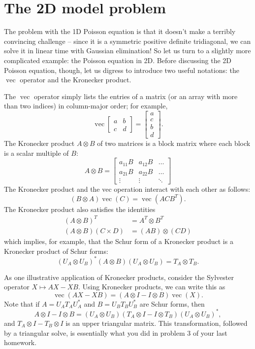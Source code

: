 \section{The 2D model problem}

The problem with the 1D Poisson equation is that it doesn't make a
terribly convincing challenge -- since it is a symmetric positive
definite tridiagonal, we can solve it in linear time with Gaussian
elimination!  So let us turn to a slightly more complicated example:
the Poisson equation in 2D.  Before discussing the 2D Poisson
equation, though, let us digress to introduce two useful notations:
the $\operatorname{vec}$ operator and the Kronecker product.

The $\operatorname{vec}$ operator simply lists the entries of a matrix (or an
array with more than two indices) in column-major order; for example,
\[
  \operatorname{vec} \begin{bmatrix} a & b \\ c & d \end{bmatrix} =
  \begin{bmatrix} a \\ c \\ b \\ d \end{bmatrix}.
\]
The Kronecker product $A \otimes B$ of two matrices is a block matrix
where each block is a scalar multiple of $B$:
\[
  A \otimes B =
  \begin{bmatrix}
    a_{11} B & a_{12} B & \ldots \\
    a_{21} B & a_{22} B & \ldots \\
    \vdots & \vdots & \ddots
  \end{bmatrix}
\]
The Kronecker product and the vec operation interact with each other
as follows:
\[
  (B \otimes A) \operatorname{vec}(C) = \operatorname{vec}(ACB^T).
\]
The Kronecker product also satisfies the identities
\begin{align*}
  (A \otimes B)^T &= A^T \otimes B^T \\
  (A \otimes B) (C \times D) &= (AB) \otimes (CD)
\end{align*}
which implies, for example, that the Schur form of a Kronecker product
is a Kronecker product of Schur forms:
\[
  (U_A \otimes U_B)^* (A \otimes B) (U_A \otimes U_B)= T_A \otimes T_B.
\]

As one illustrative application of Kronecker products, consider the
Sylvester operator $X \mapsto AX-XB$.  Using Kronecker products, we
can write this as
\[
  \operatorname{vec}(AX-XB) =
  (A \otimes I - I \otimes B) \operatorname{vec}(X).
\]
Note that if $A = U_A T_A U_A^*$ and $B = U_B T_B U_B^*$ are Schur
forms, then
\[
  A \otimes I - I \otimes B =
  (U_A \otimes U_B) (T_A \otimes I - I \otimes T_B) (U_A \otimes U_B)^*,
\]
and $T_A \otimes I - T_B \otimes I$ is an upper triangular matrix.
This transformation, followed by a triangular solve, is essentially
what you did in problem 3 of your last homework.

